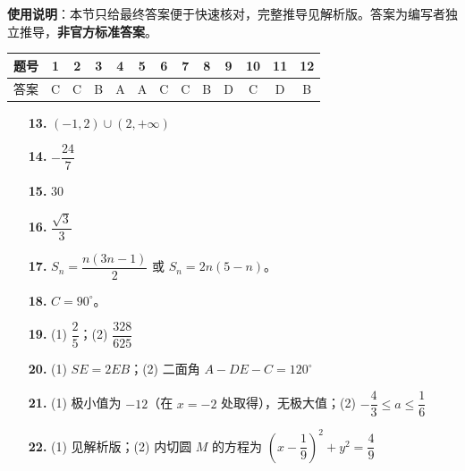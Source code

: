 
\begin{gknotice}
\textbf{使用说明}：本节只给最终答案便于快速核对，完整推导见解析版。答案为编写者独立推导，\textbf{非官方标准答案}。
\end{gknotice}

\begin{center}\begin{tabular}{ccccccccccccc}
\toprule
题号 & 1 & 2 & 3 & 4 & 5 & 6 & 7 & 8 & 9 & 10 & 11 & 12 \\
\midrule
答案 & C & C & B & A & A & C & C & B & D & C & D & B \\
\bottomrule
\end{tabular}\end{center}

\begin{itemize}[leftmargin=2.6em]
  \item[\textbf{13.}] $(-1,2)\cup(2,+\infty)$
  \item[\textbf{14.}] $-\dfrac{24}{7}$
  \item[\textbf{15.}] $30$
  \item[\textbf{16.}] $\dfrac{\sqrt3}{3}$
\end{itemize}

\begin{itemize}[leftmargin=2.6em]
  \item[\textbf{17.}] $S_n=\dfrac{n(3n-1)}2$ 或 $S_n=2n(5-n)$。
  \item[\textbf{18.}] $C=90^\circ$。
  \item[\textbf{19.}] (1) $\dfrac25$；(2) $\dfrac{328}{625}$
  \item[\textbf{20.}] (1) $SE=2EB$；(2) 二面角 $A-DE-C=120^\circ$
  \item[\textbf{21.}] (1) 极小值为 $-12$（在 $x=-2$ 处取得），无极大值；(2) $-\dfrac43\leq a\leq\dfrac16$
  \item[\textbf{22.}] (1) 见解析版；(2) 内切圆 $M$ 的方程为 $\left(x-\dfrac19\right)^2+y^2=\dfrac49$
\end{itemize}

